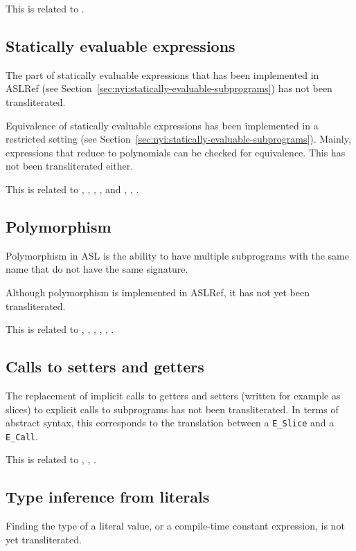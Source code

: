 \documentclass{book}
\begin{document}
This is related to .

\subsection{Statically evaluable expressions}

The part of statically evaluable expressions that has been implemented in
ASLRef (see Section~\ref{sec:nyi:statically-evaluable-subprograms}) has not
been transliterated.

Equivalence of statically evaluable expressions has been implemented in a
restricted setting (see
Section~\ref{sec:nyi:statically-evaluable-subprograms}).
%
Mainly, expressions that reduce to polynomials can be checked for equivalence.
%
This has not been transliterated either.

This is related to , , , ,
and , , .

\subsection{Polymorphism}

Polymorphism in ASL is the ability to have multiple subprograms with the same
name that do not have the same signature.

Although polymorphism is implemented in ASLRef, it has not yet been
transliterated.

This is related to , , , ,
, .

\subsection{Calls to setters and getters}

The replacement of implicit calls to getters and setters (written for example as
slices) to explicit calls to subprograms has not been transliterated.
%
In terms of abstract syntax, this corresponds to the translation between a
\texttt{E\_Slice} and a \texttt{E\_Call}.

This is related to , , .

\subsection{Type inference from literals}

Finding the type of a literal value, or a compile-time constant expression, is
not yet transliterated.
\end{document}
